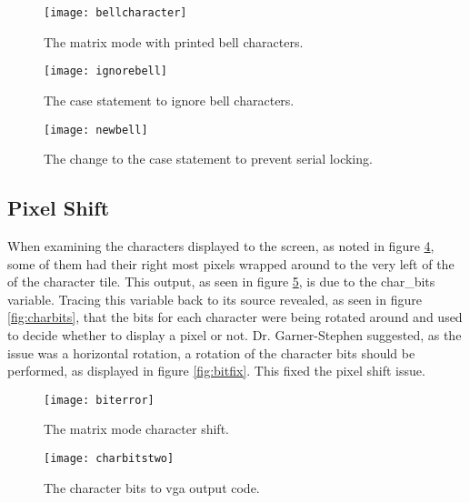 \begin{figure}
  \centering
  \texttt{[image: bellcharacter]}
  \caption{The matrix mode with printed bell characters.}
  \label{fig:bellcharacter}
\end{figure}

\begin{figure}
  \centering
  \texttt{[image: ignorebell]}
  \caption{The case statement to ignore bell characters.}
  \label{fig:ignorebell}
\end{figure}

\begin{figure}
  \centering
  \texttt{[image: newbell]}
  \caption{The change to the case statement to prevent serial locking.}
  \label{fig:newbell}
\end{figure}


\subsection{Pixel Shift}

\label{Ch5 Sec3 Sub3}

When examining the characters displayed to the screen, as noted in figure \ref{fig:biterror}, some of them had their right most pixels wrapped around to the very left of the of the character tile. This output, as seen in figure \ref{fig:charbitstwo}, is due to the char\_bits variable. Tracing this variable back to its source revealed, as seen in figure \ref{fig:charbits}, that the bits for each character were being rotated around and used to decide whether to display a pixel or not. Dr. Garner-Stephen suggested, as the issue was a horizontal rotation, a rotation of the character bits should be performed, as displayed in figure \ref{fig:bitfix}. This fixed the pixel shift issue.

\begin{figure}
  \centering
  \texttt{[image: biterror]}
  \caption{The matrix mode character shift.}
  \label{fig:biterror}
\end{figure}

\begin{figure}
  \centering
  \texttt{[image: charbitstwo]}
  \caption{The character bits to vga output code.}
  \label{fig:charbitstwo}
\end{figure}

